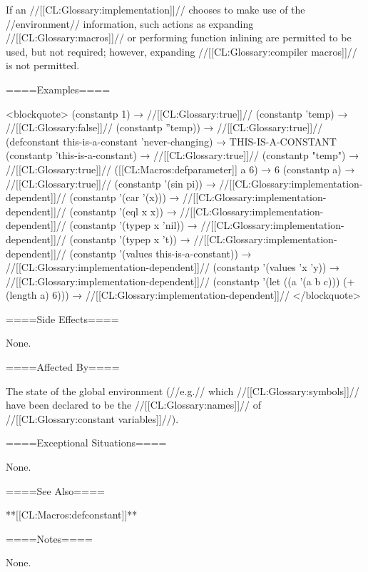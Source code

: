 If an //[[CL:Glossary:implementation]]// chooses to make use of the //environment// information, such actions as expanding //[[CL:Glossary:macros]]// or performing function inlining are permitted to be used, but not required; however, expanding //[[CL:Glossary:compiler macros]]// is not permitted.

====Examples====

<blockquote> (constantp 1) → //[[CL:Glossary:true]]// (constantp 'temp) → //[[CL:Glossary:false]]// (constantp ''temp)) → //[[CL:Glossary:true]]// (defconstant this-is-a-constant 'never-changing) → THIS-IS-A-CONSTANT (constantp 'this-is-a-constant) → //[[CL:Glossary:true]]// (constantp "temp") → //[[CL:Glossary:true]]// ([[CL:Macros:defparameter]] a 6) → 6 (constantp a) → //[[CL:Glossary:true]]// (constantp '(sin pi)) → //[[CL:Glossary:implementation-dependent]]// (constantp '(car '(x))) → //[[CL:Glossary:implementation-dependent]]// (constantp '(eql x x)) → //[[CL:Glossary:implementation-dependent]]// (constantp '(typep x 'nil)) → //[[CL:Glossary:implementation-dependent]]// (constantp '(typep x 't)) → //[[CL:Glossary:implementation-dependent]]// (constantp '(values this-is-a-constant)) → //[[CL:Glossary:implementation-dependent]]// (constantp '(values 'x 'y)) → //[[CL:Glossary:implementation-dependent]]// (constantp '(let ((a '(a b c))) (+ (length a) 6))) → //[[CL:Glossary:implementation-dependent]]// </blockquote>

====Side Effects====

None.

====Affected By====

The state of the global environment (//e.g.// which //[[CL:Glossary:symbols]]// have been declared to be the //[[CL:Glossary:names]]// of //[[CL:Glossary:constant variables]]//).

====Exceptional Situations====

None.

====See Also====

**[[CL:Macros:defconstant]]**

====Notes====

None.

  
